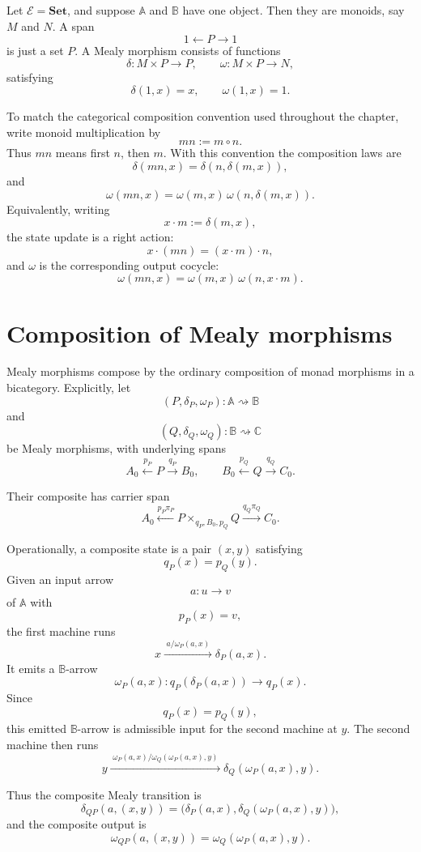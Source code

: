 \begin{example}
\label{ex:one-object-mealy}
Let \(\mathcal E=\mathbf{Set}\), and suppose \(\mathbb A\) and \(\mathbb B\) have one object. Then they are monoids, say \(M\) and \(N\). A span
\[
1\xleftarrow{}P\xrightarrow{}1
\]
is just a set \(P\). A Mealy morphism consists of functions
\[
\delta:M\times P\to P,
\qquad
\omega:M\times P\to N,
\]
satisfying
\[
\delta(1,x)=x,
\qquad
\omega(1,x)=1.
\]

To match the categorical composition convention used throughout the chapter, write monoid multiplication by
\[
mn:=m\circ n.
\]
Thus \(mn\) means first \(n\), then \(m\). With this convention the composition laws are
\[
\delta(mn,x)=\delta(n,\delta(m,x)),
\]
and
\[
\omega(mn,x)=\omega(m,x)\,\omega(n,\delta(m,x)).
\]
Equivalently, writing
\[
x\cdot m:=\delta(m,x),
\]
the state update is a right action:
\[
x\cdot(mn)=(x\cdot m)\cdot n,
\]
and \(\omega\) is the corresponding output cocycle:
\[
\omega(mn,x)=\omega(m,x)\,\omega(n,x\cdot m).
\]
\end{example}

\section{Composition of Mealy morphisms}
\label{sec:composition-of-mealy-morphisms}

Mealy morphisms compose by the ordinary composition of monad morphisms in a bicategory. Explicitly, let
\[
(P,\delta_P,\omega_P):\mathbb A\rightsquigarrow\mathbb B
\]
and
\[
(Q,\delta_Q,\omega_Q):\mathbb B\rightsquigarrow\mathbb C
\]
be Mealy morphisms, with underlying spans
\[
A_0\xleftarrow{p_P}P\xrightarrow{q_P}B_0,
\qquad
B_0\xleftarrow{p_Q}Q\xrightarrow{q_Q}C_0.
\]

Their composite has carrier span
\[
A_0
\xleftarrow{p_P\pi_P}
P\times_{q_P,B_0,p_Q}Q
\xrightarrow{q_Q\pi_Q}
C_0.
\]

Operationally, a composite state is a pair \((x,y)\) satisfying
\[
q_P(x)=p_Q(y).
\]
Given an input arrow
\[
a:u\to v
\]
of \(\mathbb A\) with
\[
p_P(x)=v,
\]
the first machine runs
\[
x
\xrightarrow{\;a/\omega_P(a,x)\;}
\delta_P(a,x).
\]
It emits a \(\mathbb B\)-arrow
\[
\omega_P(a,x):q_P(\delta_P(a,x))\to q_P(x).
\]
Since
\[
q_P(x)=p_Q(y),
\]
this emitted \(\mathbb B\)-arrow is admissible input for the second machine at \(y\). The second machine then runs
\[
y
\xrightarrow{\;\omega_P(a,x)/\omega_Q(\omega_P(a,x),y)\;}
\delta_Q(\omega_P(a,x),y).
\]

Thus the composite Mealy transition is
\[
\delta_{QP}(a,(x,y))
=
\bigl(
\delta_P(a,x),
\delta_Q(\omega_P(a,x),y)
\bigr),
\]
and the composite output is
\[
\omega_{QP}(a,(x,y))
=
\omega_Q(\omega_P(a,x),y).
\]


